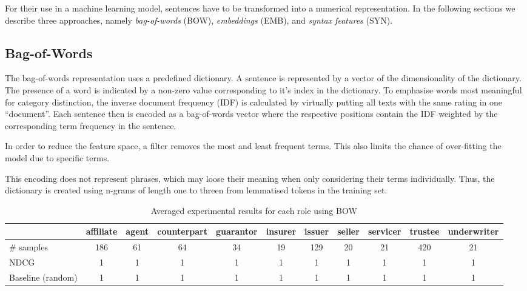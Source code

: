 For their use in a machine learning model, sentences have to be transformed into a numerical representation.
In the following sections we describe three approaches, namely \textit{bag-of-words} (BOW), \textit{embeddings} (EMB), and \textit{syntax features} (SYN).


\subsection{Bag-of-Words}
The bag-of-words representation uses a predefined dictionary.
A sentence is represented by a vector of the dimensionality of the dictionary.
The presence of a word is indicated by a non-zero value corresponding to it's index in the dictionary.
To emphasise words most meaningful for category distinction, the inverse document frequency (IDF) is calculated by virtually putting all texts with the same rating in one ``document''. 
Each sentence then is encoded as a bag-of-words vector where the respective positions contain the IDF weighted by the corresponding term frequency in the sentence.

In order to reduce the feature space, a filter removes the most and least frequent terms.
This also limits the chance of over-fitting the model due to specific terms.

This encoding does not represent phrases, which may loose their meaning when only considering their terms individually.
Thus, the dictionary is created using n-grams of length one to threen from lemmatised tokens in the training set.
\begin{table*}
	\caption{Averaged experimental results for each role using BOW}
	\label{tab:roleresults}
	\begin{tabular}{lcccccccccc}
		\toprule
		& affiliate & agent & counterpart & guarantor & insurer & issuer & seller & servicer & trustee & underwriter \\
		\midrule
		\# samples & 186       & 61    & 64          & 34        & 19      & 129    & 20     & 21       & 420     & 21          \\
		NDCG & 1 & 1 & 1 & 1 & 1 & 1 & 1 & 1 & 1 & 1 \\
		Baseline (random) & 1 & 1 & 1 & 1 & 1 & 1 & 1 & 1 & 1 & 1 \\
		\bottomrule
	\end{tabular}
\end{table*}

